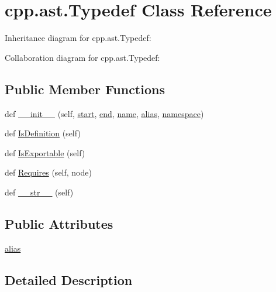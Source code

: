 \hypertarget{classcpp_1_1ast_1_1_typedef}{}\section{cpp.\+ast.\+Typedef Class Reference}
\label{classcpp_1_1ast_1_1_typedef}


Inheritance diagram for cpp.\+ast.\+Typedef\+:


Collaboration diagram for cpp.\+ast.\+Typedef\+:
\subsection*{Public Member Functions}
\begin{DoxyCompactItemize}
\item 
def \hyperlink{classcpp_1_1ast_1_1_typedef_af3275d2390190a074de470c1424e05e0}{\+\_\+\+\_\+init\+\_\+\+\_\+} (self, \hyperlink{classcpp_1_1ast_1_1_node_a7b2aa97e6a049bb1a93aea48c48f1f44}{start}, \hyperlink{classcpp_1_1ast_1_1_node_a3c5e5246ccf619df28eca02e29d69647}{end}, \hyperlink{classcpp_1_1ast_1_1___generic_declaration_af774f4729dfd78d0538a6782fe8514c1}{name}, \hyperlink{classcpp_1_1ast_1_1_typedef_a3187a504dfbefe50b866b44902823c30}{alias}, \hyperlink{classcpp_1_1ast_1_1___generic_declaration_a8aee3f11b37449d54b42a78e0a689f46}{namespace})
\item 
def \hyperlink{classcpp_1_1ast_1_1_typedef_a103bf391e665884bfbfd20fc5e6d1a19}{Is\+Definition} (self)
\item 
def \hyperlink{classcpp_1_1ast_1_1_typedef_adee58e4674b049d8e4435b5b6ad8e1d4}{Is\+Exportable} (self)
\item 
def \hyperlink{classcpp_1_1ast_1_1_typedef_aa9f65f4a97ba340f2c9ebc5e7ce27e8c}{Requires} (self, node)
\item 
def \hyperlink{classcpp_1_1ast_1_1_typedef_a451920900affc5f12e38ab8fbf5e3dea}{\+\_\+\+\_\+str\+\_\+\+\_\+} (self)
\end{DoxyCompactItemize}
\subsection*{Public Attributes}
\begin{DoxyCompactItemize}
\item 
\hyperlink{classcpp_1_1ast_1_1_typedef_a3187a504dfbefe50b866b44902823c30}{alias}
\end{DoxyCompactItemize}


\subsection{Detailed Description}


